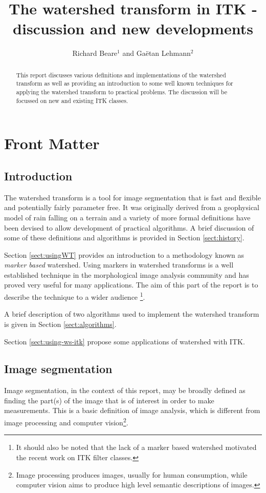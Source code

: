 \documentclass{InsightArticle}
\title{The watershed transform in ITK - discussion and new developments}
\author{Richard Beare{$^1$} {\small{and}} Ga\"etan Lehmann{$^2$}}
\begin{document}
\maketitle

\ifhtml
\chapter*{Front Matter\label{front}}
\fi


\begin{abstract}
\noindent
This report discusses various definitions and implementations of the
watershed transform as well as providing an introduction to some well
known techniques for applying the watershed transform to practical
problems. The discussion will be focussed on new and existing ITK
classes.
\end{abstract}

\tableofcontents
\section{Introduction}

The watershed transform is a tool for image segmentation that is fast
and flexible and potentially fairly parameter free. It was originally
derived from a geophysical model of rain falling on a terrain and a variety
of more formal definitions have been devised to allow development of
practical algorithms. A brief discussion of some of these definitions
and algorithms is provided in Section \ref{sect:history}. 

Section \ref{sect:usingWT} provides an introduction to a
methodology known as {\em marker based} watershed. Using markers in
watershed transforms is a well established technique in the
morphological image analysis community and has proved very useful for
many applications. The aim of this part of the report is to describe
the technique to a wider audience \footnote{It should also be noted
that the lack of a marker based watershed motivated the recent work on
ITK filter classes.}.

A brief description of two algorithms used to implement the watershed
transform is given in Section \ref{sect:algorithms}.

Section \ref{sect:using-ws-itk} propose some applications of watershed
with ITK.

\section{Image segmentation}
Image segmentation, in the context of this report, may be broadly
defined as finding the part(s) of the image that is of interest in
order to make measurements. This is a basic definition of image
analysis, which is different from image processing and computer
vision\footnote{Image processing produces images, usually for human
consumption, while computer vision aims to produce high level semantic
descriptions of images.}.
\end{document}
